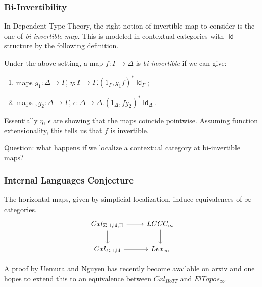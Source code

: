 \documentclass{beamer}
\DeclareMathOperator{\Id}{\mathsf{Id}}
\begin{document}
\begin{frame}
  \frametitle{Bi-Invertibility}

  In Dependent Type Theory, the right notion of invertible map to consider is
  the one of \emph{bi-invertible map}. This is modeled in contextual categories
  with $\Id$-structure by the following definition.
  \begin{defn}
    Under the above setting, a map $f\colon\Gamma\rightarrow\Delta$ is
    \emph{bi-invertible} if we can give:
    \begin{enumerate}
      \item maps $g_1\colon\Delta\rightarrow\Gamma$,
        $\eta\colon\Gamma\rightarrow\Gamma.(1_\Gamma,g_1f)^*\Id_\Gamma$;
      \item maps $,g_2\colon\Delta\rightarrow\Gamma$,
        $\epsilon\colon\Delta\rightarrow\Delta.(1_\Delta,fg_2)^*\Id_\Delta$.
    \end{enumerate}
  \end{defn}
  Essentially $\eta$, $\epsilon$ are showing that the maps coincide pointwise.
  Assuming function extensionality, this tells us that $f$ is invertible.

  Question: what happens if we localize a contextual category at bi-invertible
  maps?
\end{frame}

\begin{frame}
  \frametitle{Internal Languages Conjecture}

  \begin{conj}
    The horizontal maps, given by simplicial localization, induce
    equivalences of $\infty$-categories.
    \[\begin{tikzcd}[ampersand replacement=\&]
      {Cxl_{\Sigma,1,\Id,\Pi}} \& {LCCC_\infty} \\
      {Cxl_{\Sigma,1,\Id}} \& {Lex_{\infty}}
      \arrow[from=1-1, to=2-1]
      \arrow[from=1-2, to=2-2]
      \arrow[from=2-1, to=2-2]
      \arrow[from=1-1, to=1-2]
    \end{tikzcd}\]
  \end{conj}

  A proof by Uemura and Nguyen has recently become available on arxiv and one
  hopes to extend this to an equivalence between $Cxl_{HoTT}$ and
  $ElTopos_\infty$.
\end{frame}
\end{document}
